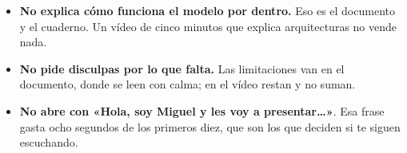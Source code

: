 \documentclass[11pt,a4paper]{article}
\begin{document}
\begin{itemize}
  \item \textbf{No explica cómo funciona el modelo por dentro.} Eso es el
        documento y el cuaderno. Un vídeo de cinco minutos que explica
        arquitecturas no vende nada.
  \item \textbf{No pide disculpas por lo que falta.} Las limitaciones van en el
        documento, donde se leen con calma; en el vídeo restan y no suman.
  \item \textbf{No abre con «Hola, soy Miguel y les voy a presentar\ldots»}.
        Esa frase gasta ocho segundos de los primeros diez, que son los que
        deciden si te siguen escuchando.
\end{itemize}
\end{document}
